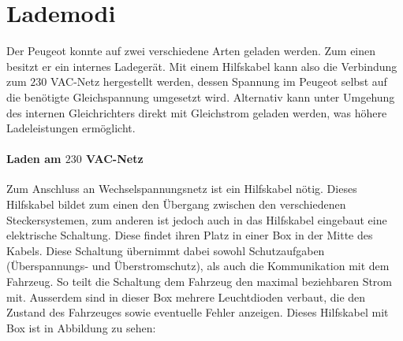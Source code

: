 \section{Lademodi}
Der Peugeot konnte auf zwei verschiedene Arten geladen werden. Zum einen besitzt er ein internes Ladegerät. Mit einem Hilfskabel kann also die Verbindung zum $230$ VAC-Netz hergestellt werden, dessen Spannung im Peugeot selbst auf die benötigte Gleichspannung umgesetzt wird. Alternativ kann unter Umgehung des internen Gleichrichters direkt mit Gleichstrom geladen werden, was höhere Ladeleistungen ermöglicht.

\paragraph{Laden am $230$ VAC-Netz}
Zum Anschluss an Wechselspannungsnetz ist ein Hilfskabel nötig. Dieses Hilfskabel bildet zum einen den Übergang zwischen den verschiedenen Steckersystemen, zum anderen ist jedoch auch in das Hilfskabel eingebaut eine elektrische Schaltung. Diese findet ihren Platz in einer Box in der Mitte des Kabels. Diese Schaltung übernimmt dabei sowohl Schutzaufgaben (Überspannungs- und Überstromschutz), als auch die Kommunikation mit dem Fahrzeug. So teilt die Schaltung dem Fahrzeug den maximal beziehbaren Strom mit. Ausserdem sind in dieser Box mehrere Leuchtdioden verbaut, die den Zustand des Fahrzeuges sowie eventuelle Fehler anzeigen. Dieses Hilfskabel mit Box ist in Abbildung  zu sehen:

